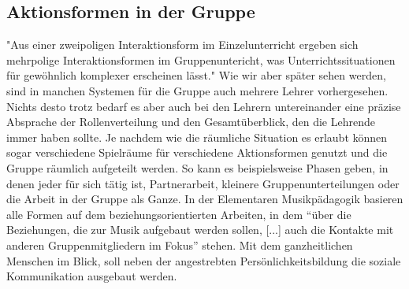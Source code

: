 \subsection{Aktionsformen in der Gruppe}
"Aus einer zweipoligen Interaktionsform im Einzelunterricht ergeben sich
mehrpolige Interaktionsformen im Gruppenuntericht, was Unterrichtssituationen
für gewöhnlich komplexer erscheinen lässt."
\autocite[30]{losert:die_kunst_zu_unterrichten} Wie wir aber später sehen
werden, sind in manchen Systemen für die Gruppe auch mehrere Lehrer
vorhergesehen. Nichts desto trotz bedarf es aber auch bei den Lehrern
untereinander eine präzise Absprache der Rollenverteilung und den
Gesamtüberblick, den die Lehrende immer haben sollte. Je nachdem wie die
räumliche Situation es erlaubt können sogar verschiedene Spielräume für
verschiedene Aktionsformen genutzt und die Gruppe räumlich aufgeteilt werden. So
kann es beispielsweise Phasen geben, in denen jeder für sich tätig ist,
Partnerarbeit, kleinere Gruppenunterteilungen oder die Arbeit in der Gruppe als
Ganze. In der Elementaren Musikpädagogik basieren alle Formen auf dem
beziehungsorientierten Arbeiten, in dem \enquote{über die Beziehungen, die zur
Musik aufgebaut werden sollen, [...] auch die Kontakte mit anderen
Gruppenmitgliedern im Fokus} \autocite[10]{dartsch:kern_des_musizierens} stehen.
Mit dem ganzheitlichen Menschen im Blick, soll neben der angestrebten
Persönlichkeitsbildung die soziale Kommunikation ausgebaut werden.


